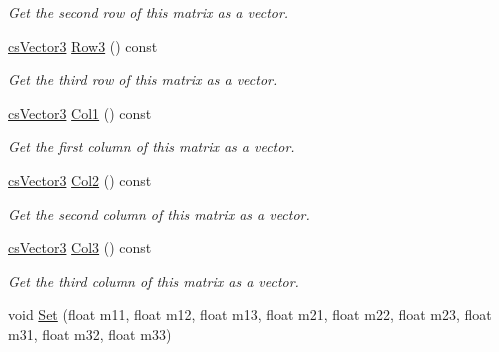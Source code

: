 \begin{DoxyCompactItemize}
\begin{DoxyCompactList}\small\item\em Get the second row of this matrix as a vector. \end{DoxyCompactList}\item 
\hyperlink{classcsVector3}{cs\+Vector3} \hyperlink{classcsMatrix3_a0b959a176543ec1f13d113f114257034}{Row3} () const \hypertarget{classcsMatrix3_a0b959a176543ec1f13d113f114257034}{}\label{classcsMatrix3_a0b959a176543ec1f13d113f114257034}

\begin{DoxyCompactList}\small\item\em Get the third row of this matrix as a vector. \end{DoxyCompactList}\item 
\hyperlink{classcsVector3}{cs\+Vector3} \hyperlink{classcsMatrix3_a42bbd5a0bb15545d1597a3e47ce9a382}{Col1} () const \hypertarget{classcsMatrix3_a42bbd5a0bb15545d1597a3e47ce9a382}{}\label{classcsMatrix3_a42bbd5a0bb15545d1597a3e47ce9a382}

\begin{DoxyCompactList}\small\item\em Get the first column of this matrix as a vector. \end{DoxyCompactList}\item 
\hyperlink{classcsVector3}{cs\+Vector3} \hyperlink{classcsMatrix3_a7929b4c55a4c45dec318ab44da480c6c}{Col2} () const \hypertarget{classcsMatrix3_a7929b4c55a4c45dec318ab44da480c6c}{}\label{classcsMatrix3_a7929b4c55a4c45dec318ab44da480c6c}

\begin{DoxyCompactList}\small\item\em Get the second column of this matrix as a vector. \end{DoxyCompactList}\item 
\hyperlink{classcsVector3}{cs\+Vector3} \hyperlink{classcsMatrix3_a4b648cf40fa5c8d68bd1e748a7b2685a}{Col3} () const \hypertarget{classcsMatrix3_a4b648cf40fa5c8d68bd1e748a7b2685a}{}\label{classcsMatrix3_a4b648cf40fa5c8d68bd1e748a7b2685a}

\begin{DoxyCompactList}\small\item\em Get the third column of this matrix as a vector. \end{DoxyCompactList}\item 
void \hyperlink{classcsMatrix3_a1e04ede544dbc62b6facd38db846a4aa}{Set} (float m11, float m12, float m13, float m21, float m22, float m23, float m31, float m32, float m33)\hypertarget{classcsMatrix3_a1e04ede544dbc62b6facd38db846a4aa}{}\label{classcsMatrix3_a1e04ede544dbc62b6facd38db846a4aa}


\end{DoxyCompactItemize}
